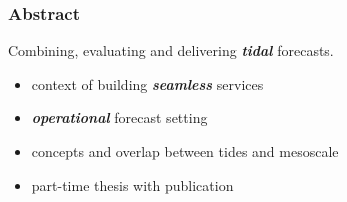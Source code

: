 \begin{frame}
\frametitle{Abstract}

Combining, evaluating and delivering \emph{\textbf{tidal}} forecasts.
\vspace{0.5cm}
\begin{itemize}
    \item context of building \emph{\textbf{seamless}} services 
    \item \emph{\textbf{operational}} forecast setting
    \item concepts and overlap between tides and mesoscale
    \item part-time thesis with publication
\end{itemize}

\end{frame}